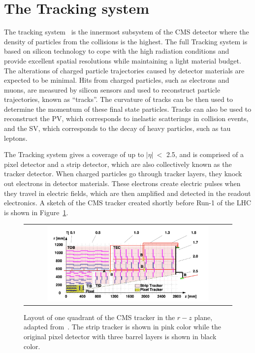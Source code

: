 \section{The Tracking system}
\label{sec:TK}

The tracking system~\cite{CMS:1997tlf} is the innermost subsystem of the \ac{CMS} detector where the density of particles from the collisions is the highest. The full Tracking system is based on silicon technology to cope with the high radiation conditions and provide excellent spatial resolutions while maintaining a light material budget. The alterations of charged particle trajectories caused by detector materials are expected to be minimal. Hits from charged particles, such as electrons and muons, are measured by silicon sensors and used to reconstruct particle trajectories, known as ``tracks''. The curvature of tracks can be then used to determine the momentum of these final state particles. Tracks can also be used to reconstruct the \ac{PV}, which corresponds to inelastic scatterings in collision events, and the \ac{SV}, which corresponds to the decay of heavy particles, such as tau leptons. 

The Tracking system gives a coverage of up to $|\eta|~<$ 2.5, and is comprised of a pixel detector and a strip detector, which are also collectively known as the tracker detector. When charged particles go through tracker layers, they knock out electrons in detector materials. These electrons create electric pulses when they travel in electric fields, which are then amplified and detected in the readout electronics. A sketch of the \ac{CMS} tracker created shortly before Run-1 of the \ac{LHC} is shown in Figure~\ref{fig:Tracker}.

\begin{figure}[tbh!]
 \begin{center}
 \begin{tabular}{c}
 \includegraphics[width=0.8\textwidth]{figures/Part2/CMS/Tracker}
 \end{tabular}
 \caption{Layout of one quadrant of the \ac{CMS} tracker in the $r-z$ plane, adapted from~\cite{CMS:2009dvy}. The strip tracker is shown in pink color while the original pixel detector with three barrel layers is shown in black color.}
 \label{fig:Tracker}
 \end{center}
\end{figure}

